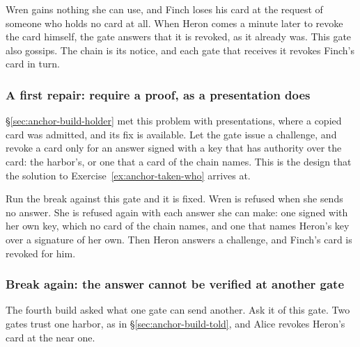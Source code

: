 
Wren gains nothing she can use, and Finch loses his card at the request of
someone who holds no card at all. When Heron comes a minute later to revoke
the card himself, the gate answers that it is revoked, as it already was.
This gate also gossips. The chain is its notice, and each gate that
receives it revokes Finch's card in turn.

\subsubsection{A first repair: require a proof, as a presentation does}

\S\ref{sec:anchor-build-holder} met this problem with presentations, where
a copied card was admitted, and its fix is available. Let the gate issue a
challenge, and revoke a card only for an answer signed with a key
that has authority over the card: the harbor's, or one that a card of the
chain names. This is the design that the solution to
Exercise~\ref{ex:anchor-taken-who} arrives at.


Run the break against this gate and it is fixed. Wren is refused when she
sends no answer. She is refused again with each answer she can make: one
signed with her own key, which no card of the chain names, and one that
names Heron's key over a signature of her own. Then Heron answers
a challenge, and Finch's card is revoked for him.

\subsubsection{Break again: the answer cannot be verified at another gate}

The fourth build asked what one gate can send another. Ask it of this
gate. Two gates trust one harbor, as in \S\ref{sec:anchor-build-told}, and
Alice revokes Heron's card at the near one.



